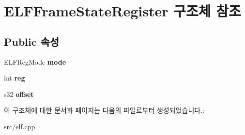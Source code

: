 \hypertarget{struct_e_l_f_frame_state_register}{}\section{E\+L\+F\+Frame\+State\+Register 구조체 참조}
\label{struct_e_l_f_frame_state_register}
\subsection*{Public 속성}
\begin{DoxyCompactItemize}
\item 
\mbox{\label{struct_e_l_f_frame_state_register_a985e32a6d582507f95e02e149837498c}} 
E\+L\+F\+Reg\+Mode {\bfseries mode}
\item 
\mbox{\label{struct_e_l_f_frame_state_register_a9c8eebd7a9afe0d48e833e7610b2153a}} 
int {\bfseries reg}
\item 
\mbox{\label{struct_e_l_f_frame_state_register_a6ef710a9432cda4aace7c893717d1a16}} 
s32 {\bfseries offset}
\end{DoxyCompactItemize}


이 구조체에 대한 문서화 페이지는 다음의 파일로부터 생성되었습니다.\+:\begin{DoxyCompactItemize}
\item 
src/elf.\+cpp\end{DoxyCompactItemize}
